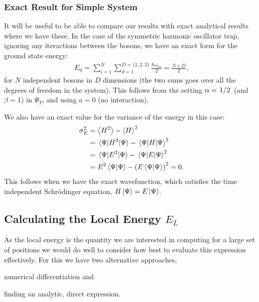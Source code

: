 \documentclass[twocolumn]{article}
\begin{document}
\subsubsection{Exact Result for Simple System}

It will be useful to be able to compare our results with exact analytical
results where we have these. In the case of the symmetric harmonic oscillator
trap, ignoring any iteractions between the bosons, we have an exact form for the
ground state energy:
\begin{align}
    E_0 = \sum_{i=1}^N\sum_{d=1}^{D=\{1,2,3\}} \frac{\hbar \omega_{ho}}{2} 
    = \frac{N\times D}{2},\label{eq:exact-ground-state}
\end{align}
for $N$ independent bosons in $D$ dimensions (the two sums goes
over all the degrees of freedom in the system). This follows from the setting
$\alpha=\flatfrac{1}{2}$ (and $\beta=1$) in $\Psi_T$, and using $a=0$ (no
interaction). 

We also have an exact value for the variance of the energy in this case:
\begin{align}
    \begin{split}
        \sigma_E^2 &= \expval{H^2} - \expval{H}^2\\
            &= \expval{H^2}{\Psi}-\expval{H}{\Psi}^2\\
            &= \expval{E^2}{\Psi}-\expval{E}{\Psi}^2\\
            &= E^2\braket{\Psi} - \qty(E\braket{\Psi})^2= 0.
    \end{split}\label{eq:var-zero-when-exact}
\end{align}
This follows when we have the exact wavefunction, which satisfies the time
independent Schrödinger equation, $H\ket{\Psi}=E\ket{\Psi}$.

\subsection{Calculating the Local Energy $E_L$}
As the local energy is the quantity we are interested in computing for a
large set of positions we would do well to consider how best to evaluate this
expression effectively. For this we have two alternative approaches,
\begin{inparaenum}[1)]
    \item numerical differentiation and
    \item finding an analytic, direct expression.
\end{inparaenum}
\end{document}
